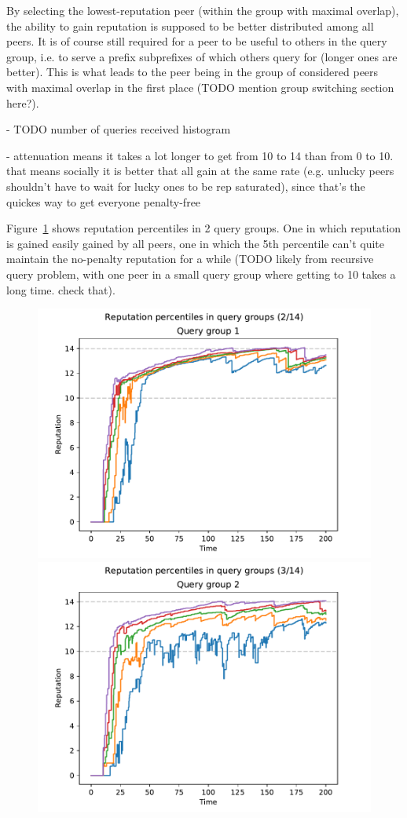 By selecting the lowest-reputation peer (within the group with maximal overlap),
the ability to gain reputation is supposed to be better distributed among all
peers. It is of course still required for a peer to be useful to others in the
query group, i.e. to serve a prefix subprefixes of which others query for
(longer ones are better). This is what leads to the peer being in the group of
considered peers with maximal overlap in the first place (TODO mention group
switching section here?).

- TODO number of queries received histogram

- attenuation means it takes a lot longer to get from 10 to 14 than from 0 to
  10. that means socially it is better that all gain at the same rate (e.g.
  unlucky peers shouldn't have to wait for lucky ones to be rep saturated),
  since that's the quickes way to get everyone penalty-free

Figure~\ref{fig:selection_overlap_rep_sorted_rep_percs} shows reputation
percentiles in 2 query groups. One in which reputation is gained easily gained
by all peers, one in which the 5th percentile can't quite maintain the
no-penalty reputation for a while (TODO likely from recursive query problem,
with one peer in a small query group where getting to 10 takes a long time.
check that).

\begin{figure}[t]
\centering
\includegraphics[width=0.49\columnwidth]{figures/selection_overlap_rep_sorted_rep_percs_2_of_14}
\includegraphics[width=0.49\columnwidth]{figures/selection_overlap_rep_sorted_rep_percs_3_of_14}
\label{fig:selection_overlap_rep_sorted_rep_percs}
\end{figure}

